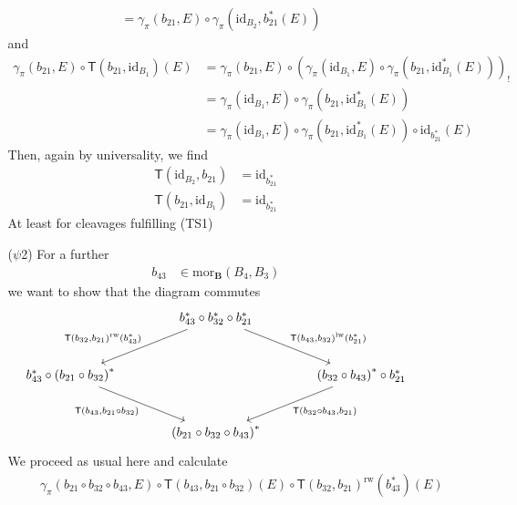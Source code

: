 \begin{enumerate}
\begin{enumerate}
\begin{align*}
  &=
  \gamma_{\pi}(b_{21},E)
  \circ
  \gamma_{\pi}(\mathrm{id}_{B_{2}},b_{21}^{\ast}(E))
\end{align*}
and
\begin{align*}
  \gamma_{\pi}(b_{21},E)
  \circ
  \mathsf{T}(b_{21},\mathrm{id}_{B_{1}})(E)
  &=
  \gamma_{\pi}(b_{21},E)
  \circ
  \left(
    \gamma_{\pi}(\mathrm{id}_{B_{1}},E)
    \circ
    \gamma_{\pi}(b_{21},\mathrm{id}_{B_{1}}^{\ast}(E))
  \right)_{!}
  \\
  &=
  \gamma_{\pi}(\mathrm{id}_{B_{1}},E)
  \circ
  \gamma_{\pi}(b_{21},\mathrm{id}_{B_{1}}^{\ast}(E))
  \\
  &=
  \gamma_{\pi}(\mathrm{id}_{B_{1}},E)
  \circ
  \gamma_{\pi}(b_{21},\mathrm{id}_{B_{1}}^{\ast}(E))
  \circ
  \mathrm{id}_{b_{21}^{\ast}}(E)
\end{align*}
Then, again by universality, we find
\begin{align*}
  \mathsf{T}(\mathrm{id}_{B_{2}},b_{21})
  &=
  \mathrm{id}_{b_{21}^{\ast}}
  \\
  \mathsf{T}(b_{21},\mathrm{id}_{B_{1}})
  &=
  \mathrm{id}_{b_{21}^{\ast}}
\end{align*}
At least for cleavages fulfilling (TS1)
\item[($\psi$2)]
For a further
\begin{align*}
  b_{43}
  &\in
  \mathrm{mor}_{\mathbf{B}}(B_{4},B_{3})
\end{align*}
we want to show that the diagram commutes
\[
\begin{tikzcd}[sep=large]
  &
  b_{43}^{\ast}
  \circ
  b_{32}^{\ast}
  \circ
  b_{21}^{\ast}
  \arrow{dr}{\mathsf{T}(b_{43},b_{32})^{\mathrm{lw}}(b_{21}^{\ast})}
  \arrow[swap]{dl}{\mathsf{T}(b_{32},b_{21})^{\mathrm{rw}}(b_{43}^{\ast})}
  &
  \\
  b_{43}^{\ast}
  \circ
  \left(
    b_{21}
    \circ
    b_{32}
  \right)^{\ast}
  \arrow[swap]{dr}{\mathsf{T}(b_{43},b_{21} \circ b_{32})}
  &
  &
  \left(
    b_{32}
    \circ
    b_{43}
  \right)^{\ast}
  \circ
  b_{21}^{\ast}
  \arrow{dl}{\mathsf{T}(b_{32} \circ b_{43},b_{21})}
  \\
  &
  \left(
    b_{21}
    \circ
    b_{32}
    \circ
    b_{43}
  \right)^{\ast}
\end{tikzcd}
\]
We proceed as usual here and calculate
\begin{align*}
  &\phantom{=}
  \gamma_{\pi}(b_{21} \circ b_{32} \circ b_{43},E)
  \circ
  \mathsf{T}(b_{43},b_{21} \circ b_{32})(E)
  \circ
  \mathsf{T}(b_{32},b_{21})^{\mathrm{rw}}(b_{43}^{\ast})
  (E)
  \\

\end{align*}
\end{enumerate}
\end{enumerate}
